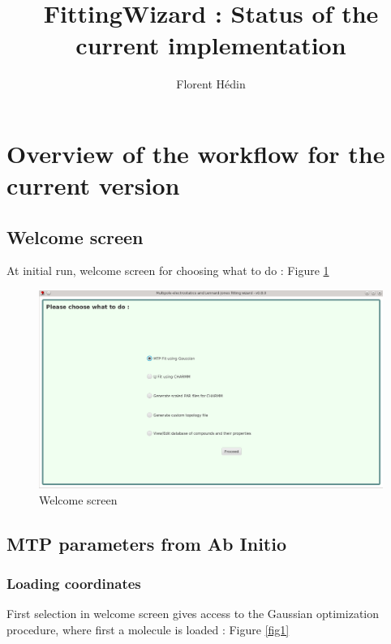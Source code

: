\documentclass[12pt,a4paper]{article}
\author{Florent Hédin}
\title{FittingWizard : Status of the current implementation}
\begin{document}
\maketitle

\tableofcontents

\section{Overview of the workflow for the current version}

\subsection{Welcome screen}

At initial run, welcome screen for choosing what to do : Figure \ref{fig0} \\


\begin{figure}[h!]
\centering
\includegraphics[width=0.9\linewidth]{pics/scr0}
\caption{Welcome screen}
\label{fig0}
\end{figure}

\subsection{MTP parameters from Ab Initio}

\subsubsection{Loading coordinates}

First selection in welcome screen gives access to the Gaussian optimization procedure, where first 
a molecule 
is loaded : Figure \ref{fig1} \\

\end{document}
